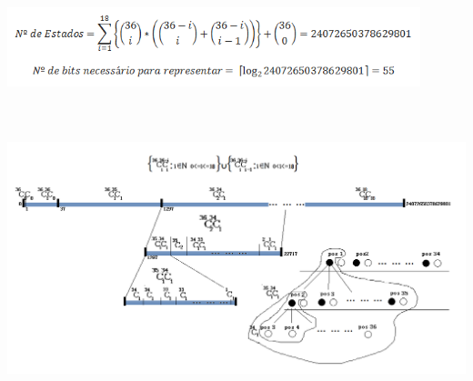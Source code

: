 \begin{table}[H]
\centering
\includegraphics[width=12cm]{images/pentago_rep0.png}

\includegraphics[height=9cm]{images/complex.png}
\end{table}